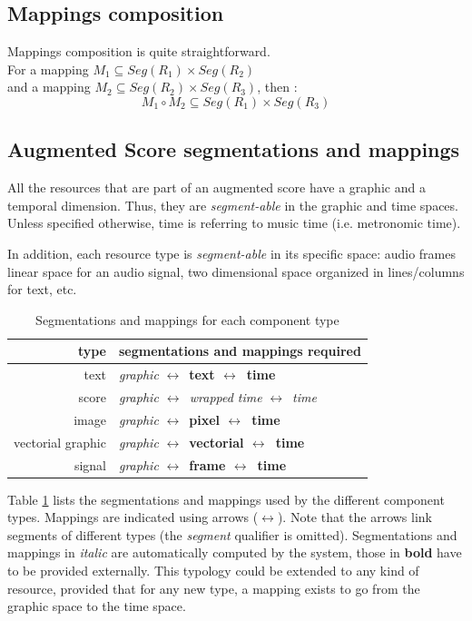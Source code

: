 \documentclass{article}
\newcommand{\seg}[1]			{Seg(#1)}
\newcommand{\lra}				{$\leftrightarrow$}
\begin{document}
\subsection{Mappings composition}\label{subsec:compmap}
Mappings composition is quite straightforward.\\
For a mapping $M_{1}\subseteq \seg{R_{1}}\times \seg{R_{2}}$ \\and a mapping $M_{2}\subseteq \seg{R_{2}}\times \seg{R_{3}}$, then :
\[ M_{1} \circ M_{2} \subseteq \seg{R_{1}}\times \seg{R_{3}} \]


\subsection{Augmented Score segmentations and mappings}\label{sec:asm}

All the resources that are part of an augmented score have a graphic and a temporal dimension. Thus, they are \emph{segment-able} in the graphic and time spaces. Unless specified otherwise, time is referring to music time (i.e. metronomic time). 

In  addition, each resource type is \emph{segment-able} in its specific space: audio frames linear space for an audio signal, two dimensional space organized in lines/columns for text, etc.

\begin{table}[htdp]
\begin{center}
\begin{tabular}{|r|l|}
\hline
type & segmentations and mappings required \\
\hline
text		& \textit{graphic} \lra\ \textbf{text  \lra\ time} \\
score		& \textit{graphic \lra\ wrapped time} \lra\ \textit{time} \\
image		& \textit{graphic} \lra\ \textbf{pixel \lra\ time} \\
vectorial graphic	&  \textit{graphic} \lra\ \textbf{vectorial \lra\ time} \\
signal		&  \textit{graphic} \lra\ \textbf{frame \lra\ time} \\
\hline
\end{tabular}
\end{center}
\caption{Segmentations and mappings for each component type}
\label{maptable}
\end{table}

Table \ref{maptable} lists the segmentations and mappings used by the different component types. Mappings are indicated using arrows (\lra). Note that the arrows link segments of different types (the \emph{segment} qualifier is omitted). Segmentations and mappings in  \textit{italic} are automatically computed by the system, those in \textbf{bold} have to be provided externally. This typology could be extended to any kind of resource, provided that for any new type, a mapping exists to go from the graphic space to the time space. 
\end{document}
